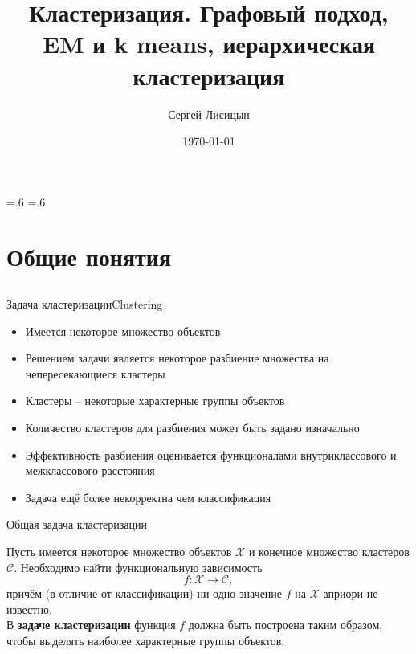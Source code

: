 \documentclass[compress,unicode]{beamer}
\title[Машинное обучение]{Кластеризация. Графовый подход, EM и k means, иерархическая кластеризация}
\author{Сергей Лисицын}
\institute{lisitsyn.s.o@gmail.com}
\date{\today}
\begin{document}
\section{}
\abovedisplayskip=.6\abovedisplayskip
\belowdisplayskip=.6\belowdisplayskip

\begin{frame}

\titlepage
\end{frame}

\section{Общие понятия}
\subsection{}
\begin{frame}{Задача кластеризации}{Clustering}
\begin{itemize}
	\item Имеется некоторое множество объектов 
	\item Решением задачи является некоторое разбиение множества на непересекающиеся кластеры
	\item Кластеры -- некоторые характерные группы объектов
	\item Количество кластеров для разбиения может быть задано изначально
	\item Эффективность разбиения оценивается функционалами внутриклассового и межклассового расстояния
	\item Задача ещё более некорректна чем классификация
\end{itemize}
\end{frame}

\begin{frame}{Общая задача кластеризации}

Пусть имеется некоторое множество объектов $\mathcal{X}$ и конечное множество кластеров $\mathcal{C}$. 
Необходимо найти функциональную зависимость
$$
f: \mathcal{X} \to \mathcal{C},
$$
причём (в отличие от классификации) ни одно значение $f$ на $\mathcal{X}$ априори не известно. \\[10pt]

В {\color{main!20!black}\bf задаче кластеризации} функция $f$ должна быть построена таким образом, чтобы выделять наиболее характерные группы объектов. 

\end{frame}
\end{document}
